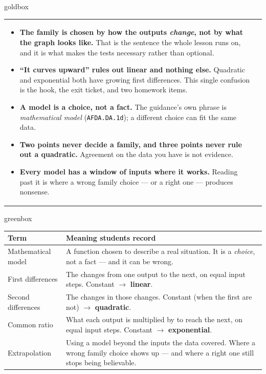 \documentclass[10pt]{article}
\begin{document}
\begin{skillbox}{goldbox}
\begin{tabularx}{\linewidth}{@{}X|X@{}}
\begin{minipage}[t]{\linewidth}
\begin{itemize}[leftmargin=1.1em, itemsep=2pt, topsep=2pt]
  \item \textbf{The family is chosen by how the outputs \emph{change}, not by what the graph looks
        like.} That is the sentence the whole lesson runs on, and it is what makes the tests
        necessary rather than optional.
  \item \textbf{``It curves upward'' rules out linear and nothing else.} Quadratic and exponential
        both have growing first differences. This single confusion is the hook, the exit ticket, and
        two homework items.
  \item \textbf{A model is a choice, not a fact.} The guidance's own phrase is
        \emph{mathematical model} (\texttt{AFDA.DA.1d}); a different choice can fit the same data.
  \item \textbf{Two points never decide a family, and three points never rule out a quadratic.}
        Agreement on the data you have is not evidence.
  \item \textbf{Every model has a window of inputs where it works.} Reading past it is where a wrong
        family choice --- or a right one --- produces nonsense.
\end{itemize}
\end{minipage}
\end{tabularx}
\end{skillbox}

\begin{skillbox}{greenbox}
\renewcommand{\arraystretch}{1.35}
\begin{tabularx}{\linewidth}{@{}p{4.1cm}X@{}}
\textbf{Term} & \textbf{Meaning students record} \\
\hline
Mathematical model & A function chosen to describe a real situation. It is a \emph{choice}, not a
    fact --- and it can be wrong. \\
First differences & The changes from one output to the next, on equal input steps. Constant $\to$
    \textbf{linear}. \\
Second differences & The changes in those changes. Constant (when the first are not) $\to$
    \textbf{quadratic}. \\
Common ratio & What each output is multiplied by to reach the next, on equal input steps. Constant
    $\to$ \textbf{exponential}. \\
Extrapolation & Using a model beyond the inputs the data covered. Where a wrong family choice shows
    up --- and where a right one still stops being believable. \\
\end{tabularx}
\end{skillbox}
\end{document}
